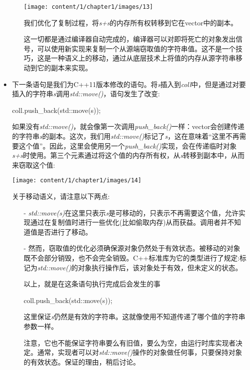 \begin{itemize}
\begin{enumerate}
		\begin{center}
			\texttt{[image: content/1/chapter1/images/13]}
		\end{center}
		我们优化了复制过程，将\textit{s+s}的内存所有权转移到它在vector中的副本。

		这一切都是通过编译器自动完成的，编译器可以对即将死亡的对象发出信号，可以使用新实现来复制一个从源端窃取值的字符串值。这不是一个技巧，这是一种语义上的移动，通过从底层技术上将值的内存从源字符串移动到它的副本来实现。

	\end{enumerate}
	\item 下一条语句是我们为C++11版本修改的语句。将\textit{s}插入到\textit{coll}中，但是通过对要插入的字符串\textit{s}调用\textit{std::move()}，语句发生了改变:
\begin{cppcode}
coll.push_back(std::move(s));
\end{cppcode}
	如果没有\textit{std::move()}，就会像第一次调用\textit{push_back()}一样：vector会创建传递的字符串\textit{s}的副本。这次，我们用\textit{std::move()}标记了\textit{s}，这在意味着“这里不再需要这个值”。因此，这里会使用另一个\textit{push_back()}实现，会在传递临时对象\textit{s+s}时使用。第三个元素通过将这个值的内存所有权，从\textit{s}转移到副本中，从而来窃取这个值:
\begin{center}
		\texttt{[image: content/1/chapter1/images/14]}
	\end{center}
	关于移动语义，请注意以下两点:

	\begin{itemize}
		\item[-] \textit{std::move(s)}在这里只表示\textit{s}是可移动的，只表示不再需要这个值，允许实现通过在复制值时进行一些优化(比如偷取内存)从而获益。调用者并不知道值是否进行了移动。
		\item[-] 然而，窃取值的优化必须确保源对象仍然处于有效状态。被移动的对象既不会部分销毁，也不会完全销毁。C++标准库为它的类型进行了规定:标记为\textit{std::move()}的对象执行操作后，该对象处于有效，但未定义的状态。

		以上，就是在这条语句执行完成后会发生的事
\begin{cppcode}
coll.push_back(std::move(s));
\end{cppcode}
		这里保证\textit{s}仍然是有效的字符串。这就像使用不知道传递了哪个值的字符串参数一样。

		注意，它也不能保证字符串要么有旧值，要么为空，由运行时库实现者决定。通常，实现者可以对\textit{std::move()}操作的对象做任何事，只要保持对象的有效状态。保证的理由，稍后讨论。
	\end{itemize}
	

\end{itemize}
